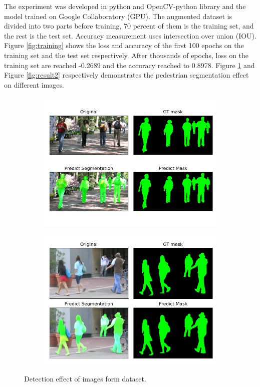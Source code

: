 \documentclass[10pt, a4paper]{article}
\begin{document}
\begin{multicols}{2}
	The experiment was developed in python and OpenCV-python library and the model trained on Google Collaboratory (GPU). The augmented dataset is divided into two parts before training, 70 percent of them is the training set, and the rest is the test set. Accuracy measurement uses intersection over union (IOU). Figure \ref{fig:training} shows the loss and accuracy of the first 100 epochs on the training set and the test set respectively. After thousands of epochs, loss on the training set are reached -0.2689 and the accuracy reached to 0.8978. Figure \ref{fig:result1} and Figure \ref{fig:result2} respectively demonstrates the pedestrian segmentation effect on different images.
	\lipsum[1-3]
	\begin{figure}[htb] %
	  \centering
	  \begin{subfigure}[b]{0.45\linewidth}
	    \includegraphics[width=\linewidth]{predictMask1.png}
	  \end{subfigure}
	  \begin{subfigure}[b]{0.45\linewidth}
	    \includegraphics[width=\linewidth]{predictMask2.png}
	  \end{subfigure}
	  \caption{Detection effect of images form dataset.}
	  \label{fig:result1}
	\end{figure}
	\lipsum[4]


\end{multicols}
\end{document}
